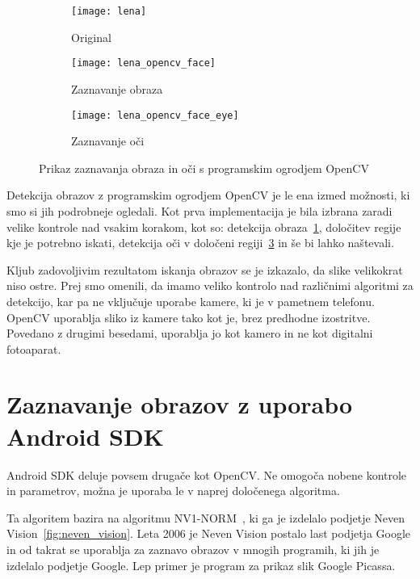 \begin{figure}[!ht]
    \centering
    \begin{subfigure}[b]{0.3\textwidth}
        \texttt{[image: lena]}
        \caption{Original}
    \end{subfigure}
    \begin{subfigure}[b]{0.3\textwidth}
        \texttt{[image: lena\_opencv\_face]}
        \caption{Zaznavanje obraza}
        \label{fig:lena_opencv_face}
    \end{subfigure}
    \begin{subfigure}[b]{0.3\textwidth}
        \texttt{[image: lena\_opencv\_face\_eye]}
        \caption{Zaznavanje oči}
        \label{fig:lena_opencv_face_eye}
    \end{subfigure}
    \caption{Prikaz zaznavanja obraza in oči s programskim ogrodjem OpenCV}
\end{figure}

Detekcija obrazov z programskim ogrodjem OpenCV je le ena izmed možnosti, ki
smo si jih podrobneje ogledali. Kot prva implementacija je bila izbrana zaradi
velike kontrole nad vsakim korakom, kot so: detekcija
obraza~\ref{fig:lena_opencv_face}, določitev regije kje je potrebno iskati, detekcija oči
v določeni regiji~\ref{fig:lena_opencv_face_eye} in še bi lahko naštevali.

Kljub zadovoljivim rezultatom iskanja obrazov se je izkazalo, da slike velikokrat niso ostre. Prej smo omenili, da imamo veliko kontrolo nad različnimi algoritmi za detekcijo, kar pa ne vključuje uporabe kamere, ki je v
pametnem telefonu. OpenCV uporablja sliko iz kamere tako kot je, brez predhodne izostritve. Povedano z drugimi besedami, uporablja jo kot kamero in ne kot digitalni fotoaparat.


\section{Zaznavanje obrazov z uporabo Android SDK}
Android SDK deluje povsem drugače kot OpenCV. Ne omogoča nobene kontrole in parametrov, možna je uporaba le v naprej določenega algoritma.

Ta algoritem bazira na algoritmu NV1-NORM~\cite{nevenFaceRecognition}, ki ga je
izdelalo podjetje Neven Vision~\ref{fig:neven_vision}. Leta 2006 je Neven
Vision postalo last podjetja Google in od takrat se uporablja za zaznavo obrazov v
mnogih programih, ki jih je izdelalo podjetje Google. Lep  primer je program za prikaz slik Google Picassa.

